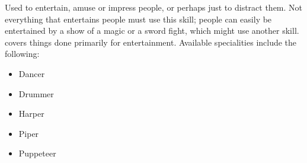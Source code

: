
Used to entertain, amuse or impress people, or perhaps just to distract them.
Not everything that entertains people must use this skill; people can easily be entertained by a show of a magic or a sword fight, which might use another skill.
 covers things done primarily for entertainment.
Available specialities include the following:

\begin{itemize}
	\item Dancer
	\item Drummer
	\item Harper
	\item Piper
	\item Puppeteer
\end{itemize}

